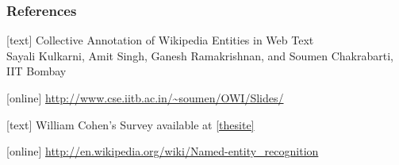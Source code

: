 
\begin{frame}
\frametitle{References}
\begin{thebibliography}{9}
[text]
 \label{thepaper} Collective Annotation of Wikipedia Entities in Web Text \\

Sayali Kulkarni, Amit Singh, Ganesh Ramakrishnan, and Soumen Chakrabarti,
 IIT Bombay

[online]
  \label{thesite} \url{http://www.cse.iitb.ac.in/~soumen/OWI/Slides/}

[text]
 \label{thesurvey} William Cohen's Survey available at \ref{thesite}

[online]
 \label{thewiki} \url{http://en.wikipedia.org/wiki/Named-entity_recognition}

\end{thebibliography}
\end{frame}